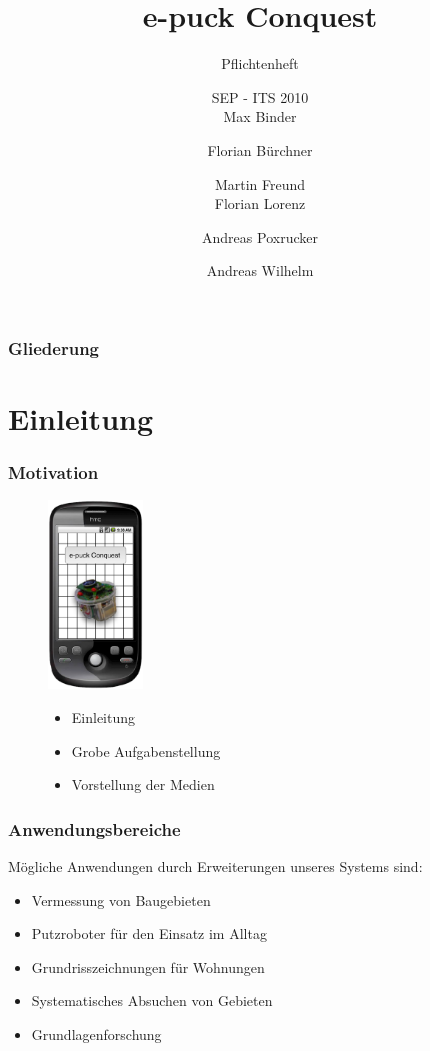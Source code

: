 \documentclass{beamer}
\title[Pflichtenheft] %
{e-puck Conquest}
\subtitle
{Pflichtenheft}
\author[Autor, Anders] %
{SEP - ITS 2010 \\ Max Binder \and Florian Bürchner \and Martin Freund
	\\ Florian Lorenz \and Andreas Poxrucker \and Andreas Wilhelm}
\institute[Universität Passau] %
{
  Fakultät für Informatik und Mathematik\\
  Universität Passau}
\begin{document}
\begin{frame}
  \titlepage
\end{frame}

\begin{frame}
  \frametitle{Gliederung}
  \tableofcontents
\end{frame}

\section{Einleitung}

\begin{frame}
  \frametitle{Motivation}
  \begin{figure}[htbp]
	\begin{minipage}[t]{5cm}
		\vspace{0pt}
		\includegraphics[height=5cm]{images/logo.eps} 
	\end{minipage}
	\hfill
	\begin{minipage}[t]{0.5\textwidth}
		\vspace{30pt}
		\begin{itemize}
			\item Einleitung
			\item Grobe Aufgabenstellung
			\item Vorstellung der Medien
		\end{itemize}
	\end{minipage}
   \end{figure}
\end{frame}

\begin{frame}
  \frametitle{Anwendungsbereiche}

Mögliche Anwendungen durch Erweiterungen unseres Systems sind:

	\begin{itemize}
	    \item Vermessung von Baugebieten
        \item Putzroboter für den Einsatz im Alltag
		\item Grundrisszeichnungen für Wohnungen
		\item Systematisches Absuchen von Gebieten
		\item Grundlagenforschung
	\end{itemize}

\end{frame}
\end{document}
